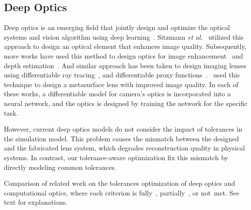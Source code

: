 \subsection{Deep Optics}
Deep optics is an emerging field that jointly design and optimize the optical systems and vision algorithm using deep learning~\cite{wetzstein2020inference}. Sitzmann \textit{et al.}~\cite{sitzmann2018end} utilized this approach to design an optical element that enhances image quality. Subsequently, more works have used this method to design optics for image enhancement~\cite{dun2020learned, metzler2020deep, sun2020learning, chakravarthula2023thin} and depth estimation~\cite{chang2019deep, haim2018depth, wu2019phasecam3d, baek2021single}. And similar approach has been taken to design imaging lenses using differentiable ray tracing~\cite{sun2021end, wang2022differentiable, yang2024curriculum}, and differentiable proxy functions~\cite{tseng2021differentiable, yang2023aberration}.~\citet{tseng2021neural} used this technique to design a metasurface lens with improved image quality. In each of these works, a differentiable model for camera's optics is incorporated into a neural network, and the optics is designed by training the network for the specific task.

However, current deep optics models do not consider the impact of tolerances in the simulation model. This problem causes the mismatch between the designed and the fabricated lens system, which degrades reconstruction quality in physical systems. In contrast, our tolerance-aware optimization fix this mismatch by directly modeling common tolerances.

\begin{table}[t]  
    \setlength{\tabcolsep}{0em}  
    \renewcommand{\arraystretch}{1.2}
    \centering  
    \footnotesize  
    \caption{  
        Comparison of related work on the tolerances optimization of deep optics and computational optics, where each criterion is fully~\greencheck, partially~\yellowcheck, or not~\redcheck met.  
        See text for explanations.  
        }  
      
    \label{tab:related_work}  
\end{table}


